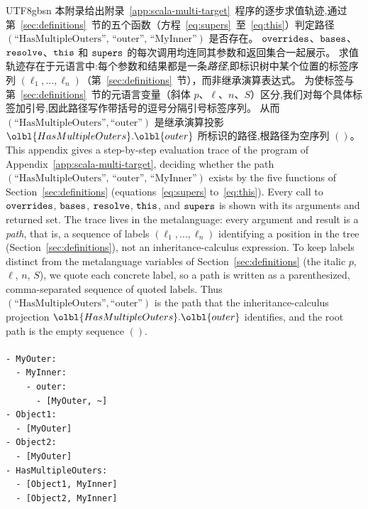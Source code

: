 \begin{CJK*}{UTF8}{gbsn}
\ifPaperChinese
本附录给出附录~\ref{app:scala-multi-target}~程序的逐步求值轨迹,通过第~\ref{sec:definitions}~节的五个函数（方程~\ref{eq:supers}~至~\ref{eq:this}）判定路径 $(\text{``HasMultipleOuters''},\, \text{``outer''},\, \text{``MyInner''})$ 是否存在。
$\mathtt{overrides}$、$\mathtt{bases}$、$\mathtt{resolve}$、$\mathtt{this}$ 和 $\mathtt{supers}$ 的每次调用均连同其参数和返回集合一起展示。
求值轨迹存在于元语言中:每个参数和结果都是一条\emph{路径},即标识树中某个位置的标签序列 $(\ell_1, \ldots, \ell_n)$（第~\ref{sec:definitions}~节），而非继承演算表达式。
为使标签与第~\ref{sec:definitions}~节的元语言变量（斜体 $p$、$\ell$、$n$、$S$）区分,我们对每个具体标签加引号,因此路径写作带括号的逗号分隔引号标签序列。
从而 $(\text{``HasMultipleOuters''}, \text{``outer''})$ 是继承演算投影 $\olbl{HasMultipleOuters}.\olbl{outer}$ 所标识的路径,根路径为空序列 $()$。
\else
This appendix gives a step-by-step evaluation trace of the program of
Appendix~\ref{app:scala-multi-target}, deciding whether the path
$(\text{``HasMultipleOuters''},\, \text{``outer''},\, \text{``MyInner''})$
exists by the five
functions of Section~\ref{sec:definitions}
(equations~\ref{eq:supers} to~\ref{eq:this}).
Every call to $\mathtt{overrides}$, $\mathtt{bases}$, $\mathtt{resolve}$, $\mathtt{this}$, and $\mathtt{supers}$
is shown with its arguments and returned set.
The trace lives in the metalanguage: every argument and result is a
\emph{path}, that is, a sequence of labels
$(\ell_1, \ldots, \ell_n)$ identifying a position in the tree
(Section~\ref{sec:definitions}), not an inheritance-calculus expression.
To keep labels distinct from the metalanguage variables of
Section~\ref{sec:definitions} (the italic $p$, $\ell$, $n$, $S$), we
quote each concrete label, so a path is written as a parenthesized,
comma-separated sequence of quoted labels.
Thus $(\text{``HasMultipleOuters''}, \text{``outer''})$ is the path that
the inheritance-calculus projection
$\olbl{HasMultipleOuters}.\olbl{outer}$ identifies, and the root path
is the empty sequence $()$.
\fi

\paragraph{}
\begin{verbatim}
- MyOuter:
  - MyInner:
    - outer:
      - [MyOuter, ~]
- Object1:
  - [MyOuter]
- Object2:
  - [MyOuter]
- HasMultipleOuters:
  - [Object1, MyInner]
  - [Object2, MyInner]
\end{verbatim}


\end{CJK*}
